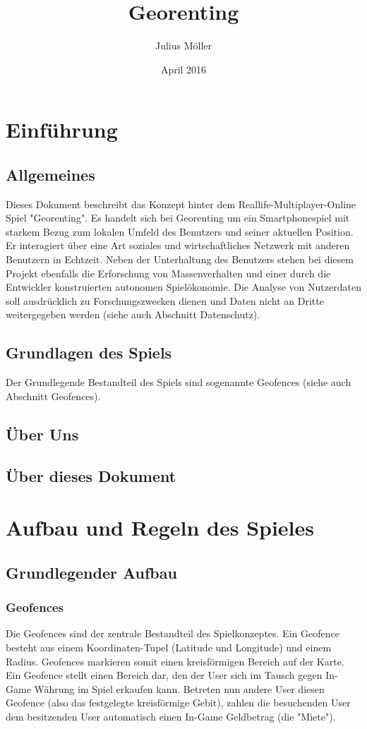 \documentclass{scrreprt}
\title{Georenting}
\author{Julius Möller}
\date{April 2016}
\begin{document}
\maketitle

\tableofcontents


\chapter{Einführung}
\section{Allgemeines}
Dieses Dokument beschreibt das Konzept hinter dem Reallife-Multiplayer-Online Spiel "Georenting". Es handelt sich bei Georenting um ein Smartphonespiel mit starkem Bezug zum lokalen Umfeld des Benutzers und seiner aktuellen Position. Er interagiert über eine Art soziales und wirtschaftliches Netzwerk mit anderen Benutzern in Echtzeit. Neben der Unterhaltung des Benutzers stehen bei diesem Projekt ebenfalls die Erforschung von Massenverhalten und einer durch die Entwickler konstruierten autonomen Spielökonomie. Die Analyse von Nutzerdaten soll ausdrücklich zu Forschungszwecken dienen und Daten nicht an Dritte weitergegeben werden (siehe auch Abschnitt Datenschutz).
\section{Grundlagen des Spiels}
Der Grundlegende Bestandteil des Spiels sind sogenannte Geofences (siehe auch Abschnitt Geofences). 
\section{Über Uns}
\section{Über dieses Dokument}

\chapter{Aufbau und Regeln des Spieles}
\section{Grundlegender Aufbau}
\subsection{Geofences}
Die Geofences sind der zentrale Bestandteil des Spielkonzeptes. Ein Geofence besteht aus einem Koordinaten-Tupel (Latitude und Longitude) und einem Radius. Geofences markieren somit einen kreisförmigen Bereich auf der Karte. 
Ein Geofence stellt einen Bereich dar, den der User sich im Tausch gegen In-Game Währung im Spiel erkaufen kann. Betreten nun andere User diesen Geofence (also das festgelegte kreisförmige Gebit), zahlen die besuchenden User dem besitzenden User automatisch einen In-Game Geldbetrag (die "Miete").\\
\end{document}
